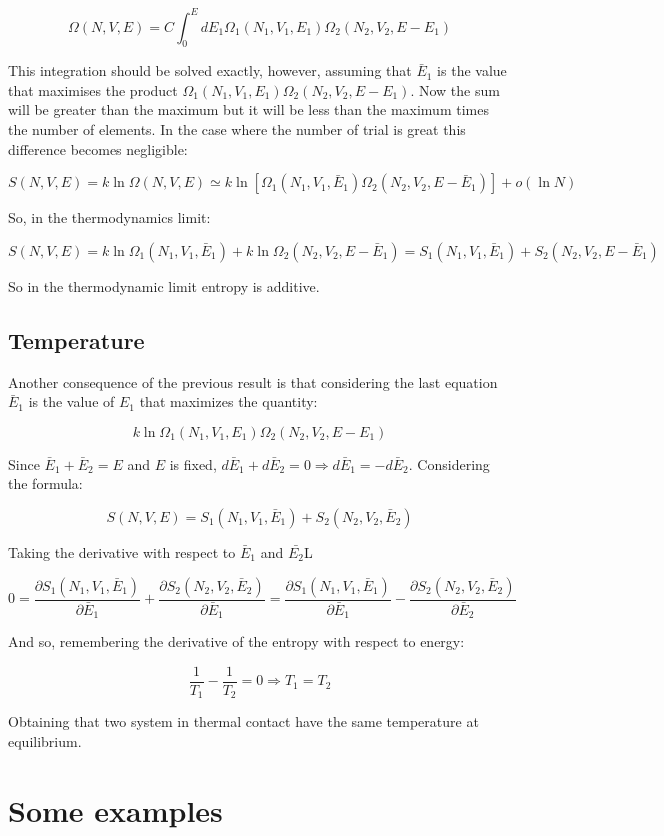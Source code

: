 $$\Omega(N, V, E) = C\int_0^EdE_1\Omega_1(N_1, V_1, E_1)\Omega_2(N_2, V_2, E - E_1)$$

This integration should be solved exactly, however, assuming that $\bar{E}_1$ is the value that maximises the product $\Omega_1(N_1, V_1, E_1)\Omega_2(N_2, V_2, E - E_1)$.
Now the sum will be greater than the maximum but it will be less than the maximum times the number of elements.
In the case where the number of trial is great this difference becomes negligible:

$$S(N, V, E) = k\ln\Omega(N, V, E)\simeq k\ln[\Omega_1(N_1, V_1, \bar{E}_1)\Omega_2(N_2, V_2, E-\bar{E}_1)] + o(\ln N)$$

So, in the thermodynamics limit:

$$S(N, V, E) = k\ln\Omega_1(N_1, V_1, \bar{E}_1) + k\ln\Omega_2(N_2, V_2, E-\bar{E}_1) = S_1(N_1, V_1, \bar{E}_1) + S_2(N_2, V_2, E - \bar{E}_1)$$

So in the thermodynamic limit entropy is additive.

	\subsection{Temperature}
	Another consequence of the previous result is that considering the last equation $\bar{E}_1$ is the value of $E_1$ that maximizes the quantity:

	$$k\ln\Omega_1(N_1, V_1, E_1)\Omega_2(N_2, V_2, E - E_1)$$

	Since $\bar{E}_1+\bar{E}_2 = E$ and $E$ is fixed, $d\bar{E}_1 + d\bar{E}_2 = 0\Rightarrow d\bar{E}_1 = -d\bar{E}_2$.
	Considering the formula:

	$$S(N, V, E) = S_1(N_1, V_1, \bar{E}_1) + S_2(N_2, V_2, \bar{E}_2)$$

	Taking the derivative with respect to $\bar{E}_1$ and $\bar{E_2}$L

	$$0 = \frac{\partial S_1(N_1, V_1, \bar{E}_1)}{\partial\bar{E}_1} + \frac{\partial S_2(N_2, V_2, \bar{E}_2)}{\partial\bar{E}_1} = \frac{\partial S_1(N_1, V_1, \bar{E}_1)}{\partial\bar{E}_1} - \frac{\partial S_2(N_2, V_2, \bar{E}_2)}{\partial\bar{E}_2}$$

	And so, remembering the derivative of the entropy with respect to energy:

	$$\frac{1}{T_1}-\frac{1}{T_2} = 0\Rightarrow T_1 = T_2$$

	Obtaining that two system in thermal contact have the same temperature at equilibrium.

\section{Some examples}

